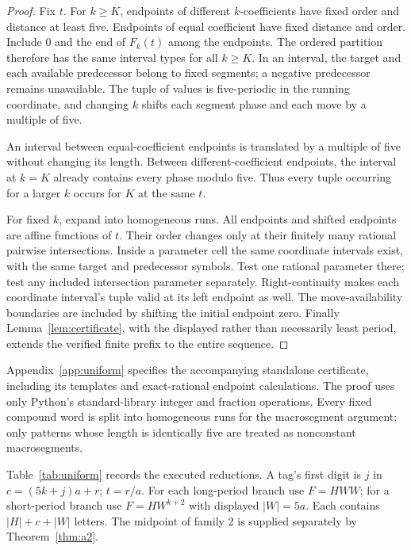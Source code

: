 \documentclass[11pt]{article}
\theoremstyle{remark}\newtheorem{remark}[theorem]{Remark}
\begin{document}
\begin{proof}
Fix $t$. For $k\ge K$, endpoints of different $k$-coefficients have fixed order and distance at least five. Endpoints of equal coefficient have fixed distance and order. Include $0$ and the end of $F_k(t)$ among the endpoints. The ordered partition therefore has the same interval types for all $k\ge K$. In an interval, the target and each available predecessor belong to fixed segments; a negative predecessor remains unavailable. The tuple of values is five-periodic in the running coordinate, and changing $k$ shifts each segment phase and each move by a multiple of five.

An interval between equal-coefficient endpoints is translated by a multiple of five without changing its length. Between different-coefficient endpoints, the interval at $k=K$ already contains every phase modulo five. Thus every tuple occurring for a larger $k$ occurs for $K$ at the same $t$.

For fixed $k$, expand into homogeneous runs. All endpoints and shifted endpoints are affine functions of $t$. Their order changes only at their finitely many rational pairwise intersections. Inside a parameter cell the same coordinate intervals exist, with the same target and predecessor symbols. Test one rational parameter there; test any included intersection parameter separately. Right-continuity makes each coordinate interval's tuple valid at its left endpoint as well. The move-availability boundaries are included by shifting the initial endpoint zero. Finally Lemma~\ref{lem:certificate}, with the displayed rather than necessarily least period, extends the verified finite prefix to the entire sequence.
\end{proof}

Appendix~\ref{app:uniform} specifies the accompanying standalone certificate, including its templates and exact-rational endpoint calculations. The proof uses only Python's standard-library integer and fraction operations. Every fixed compound word is split into homogeneous runs for the macrosegment argument; only patterns whose length is identically five are treated as nonconstant macrosegments.

Table~\ref{tab:uniform} records the executed reductions. A tag's first digit is $j$ in $c=(5k+j)a+r$; $t=r/a$. For each long-period branch use $F=HWW$; for a short-period branch use $F=HW^{k+2}$ with displayed $|W|=5a$. Each contains $|H|+c+|W|$ letters. The midpoint of family 2 is supplied separately by Theorem~\ref{thm:a2}.
\end{document}
